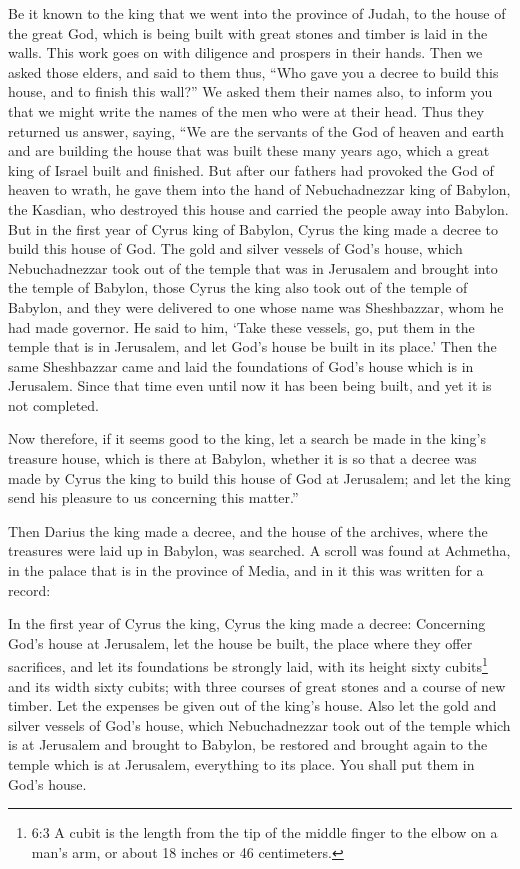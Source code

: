 \myverse{}Be it known to the king that we went into the province
of Judah, to the house of the great God, which is being built with great stones and timber is laid in
the walls. This work goes on with diligence and prospers in their hands.
\myverse{}Then we asked those elders, and said to them thus, “Who gave you a decree to
build this house, and to finish this wall?”
\myverse{}We asked them their names also, to inform you that we might write the names
of the men who were at their head.
\myverse{}Thus they returned us answer, saying, “We are the servants of the God of heaven
and earth and are building the house that was built these many years ago, which a great king of Israel
built and finished.
\myverse{}But after our fathers had provoked the God of heaven to wrath, he gave them
into the hand of Nebuchadnezzar king of Babylon, the Kasdian, who destroyed this house and carried the
people away into Babylon.
\myverse{}But in the first year of Cyrus king of Babylon, Cyrus the king made a decree
to build this house of God.
\myverse{}The gold and silver vessels of God’s house, which Nebuchadnezzar took out
of the temple that was in Jerusalem and brought into the temple of Babylon, those Cyrus the king also
took out of the temple of Babylon, and they were delivered to one whose name was Sheshbazzar, whom he
had made governor.
\myverse{}He said to him, ‘Take these vessels, go, put them in the temple that is in
Jerusalem, and let God’s house be built in its place.’
\myverse{}Then the same Sheshbazzar came and laid the foundations of God’s house which
is in Jerusalem. Since that time even until now it has been being built, and yet it is not completed.

\myverse{}Now therefore, if it seems good to the king, let a
search be made in the king’s treasure house, which is there at Babylon, whether it is so that a decree
was made by Cyrus the king to build this house of God at Jerusalem; and let the king send his pleasure
to us concerning this matter.”


\mychapter{} \myverse*{}Then Darius the king made a decree, and the house of the archives,
where the treasures were laid up in Babylon, was searched.
\myverse{}A scroll was found at Achmetha, in the palace that is in the province of Media,
and in it this was written for a record:


\vspace{\baselineskip} \myverse{}In the first year of Cyrus the king, Cyrus the king
made a decree: Concerning God’s house at Jerusalem, let the house be built, the place where they offer
sacrifices, and let its foundations be strongly laid, with its height sixty cubits\footnote{6:3 A cubit is the length from the tip of the middle finger to the elbow on a man’s arm, or about
	18 inches or 46 centimeters.} and its width sixty cubits;
\myverse{}with three courses of great stones and a course of new timber. Let the expenses
be given out of the king’s house.
\myverse{}Also let the gold and silver vessels of God’s house, which Nebuchadnezzar took
out of the temple which is at Jerusalem and brought to Babylon, be restored and brought again to the temple
which is at Jerusalem, everything to its place. You shall put them in God’s house.

